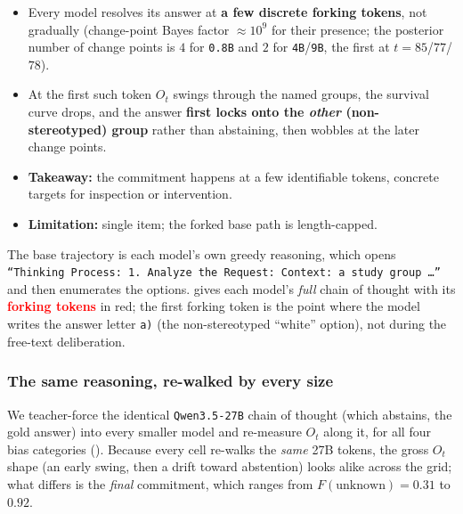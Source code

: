 \begin{itemize}[leftmargin=*,topsep=3pt,itemsep=3pt]
  \item Every model resolves its answer at \textbf{a few discrete forking tokens}, not gradually
    (change-point Bayes factor ${\approx}10^{9}$ for their presence; the posterior number of
    change points is $4$ for \texttt{0.8B} and $2$ for \texttt{4B}/\texttt{9B}, the first at
    $t{=}85$/$77$/$78$).
  \item At the first such token $O_t$ swings through the named groups, the survival curve drops,
    and the answer \textbf{first locks onto the \emph{other} (non-stereotyped) group} rather than
    abstaining, then wobbles at the later change points.
  \item \textbf{Takeaway:} the commitment happens at a few identifiable tokens, concrete targets
    for inspection or intervention.
  \item \textbf{Limitation:} single item; the forked base path is length-capped.
\end{itemize}

The base trajectory is each model's own greedy reasoning, which opens \texttt{``Thinking
Process: 1. Analyze the Request: Context: a study group \ldots''} and then enumerates the
options.  gives each model's \emph{full} chain of thought with
its \textcolor{red}{\textbf{forking tokens}} in red; the first forking token is the point where
the model writes the answer letter \texttt{a)} (the non-stereotyped ``white'' option), not during
the free-text deliberation.




\subsubsection{The same reasoning, re-walked by every size}
We teacher-force the identical \texttt{Qwen3.5-27B} chain of thought (which abstains, the gold
answer) into every smaller model and re-measure $O_t$ along it, for all four bias categories
(). Because every cell re-walks the \emph{same} 27B tokens, the
gross $O_t$ shape (an early swing, then a drift toward abstention) looks alike across the grid;
what differs is the \emph{final} commitment, which ranges from $F(\text{unknown}){=}0.31$ to
$0.92$.

